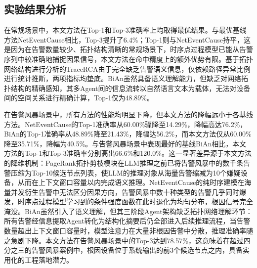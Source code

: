 \begin{table}[htbp]
\centering
\caption{本文方法与各基线方法的定位准确率对比}
\label{tab:comparison}
\end{table}
\subsection{实验结果分析}

在常规场景中，本文方法在Top-1和Top-3准确率上均取得最优结果。与最优基线方法NetEventCause相比，Top-3提升了6.4\%；Top-1则与NetEventCause持平，这是因为在告警数量较少、拓扑结构清晰的常规场景下，时序点过程模型已能从告警序列中较准确地捕捉因果信号，本文方法在命中精度上的额外优势有限。基于拓扑网络结构进行分析的TraceRCA由于完全缺乏告警语义信息，仅依赖路径异常比例进行统计推断，两项指标均垫底。BiAn虽然具备语义理解能力，但缺乏对网络拓扑结构的精确感知，其多Agent间的信息流转以自然语言文本为载体，无法对设备间的空间关系进行精确计算，Top-1仅为48.89\%。

在告警风暴场景中，所有方法的性能均明显下降，但本文方法的降幅远小于各基线方法。NetEventCause的Top-1准确率从60.00\%骤降至14.29\%，降幅高达76.2\%，BiAn的Top-1准确率从48.89\%降至21.43\%，降幅达56.2\%，而本文方法仅从60.00\%降至35.71\%，降幅为40.5\%。与告警风暴场景中表现最好的基线BiAn相比，本文方法的Top-1和Top-3准确率分别高出66.6\%和120.0\%。这一显著差异源于本文方法的降维机制：PageRank拓扑剪枝模块在LLM推理之前已将告警风暴中的数千条告警压缩为Top-10候选节点列表，使LLM的推理对象从海量告警缩减为10个嫌疑设备，从而在上下文窗口容量以内完成语义推理。NetEventCause的纯时序建模在海量并发衍生告警中无法区分因果方向，告警风暴中数十种类型的告警几乎同时爆发，时序点过程模型学习到的条件强度函数在此时退化为均匀分布，根因信号完全淹没。BiAn虽然引入了语义理解，但其三阶段Agent架构缺乏拓扑网络理解环节：所有告警经信息提取Agent转化为结构化摘要后仍全部进入后续推理流程，当告警数量超出上下文窗口容量时，模型注意力在大量非根因告警中分散，推理准确率随之急剧下降。本文方法在告警风暴场景中的Top-3达到78.57\%，这意味着在超过四分之三的告警风暴案例中，根因设备位于系统输出的前3个候选节点之内，具备实用化的工程落地潜力。

